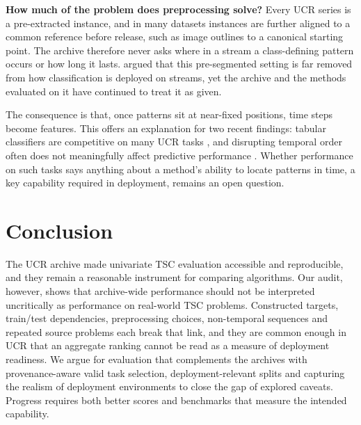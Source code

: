 \documentclass{article}
\begin{document}
\textbf{How much of the problem does preprocessing solve?}
Every UCR series is a pre-extracted instance, and in many datasets instances are further aligned to a common reference before release, such as image outlines to a canonical starting point. The archive therefore never asks where in a stream a class-defining pattern occurs or how long it lasts. \citet{hu2016streaming} argued that this pre-segmented setting is far removed from how classification is deployed on streams, yet the archive and the methods evaluated on it have continued to treat it as given.

The consequence is that, once patterns sit at near-fixed positions, time steps become features. This offers an explanation for two recent findings: tabular classifiers are competitive on many UCR tasks \citep{dhariyal2023backtobasics}, and disrupting temporal order often does not meaningfully affect predictive performance \citep{zhang2025revisit}. Whether performance on such tasks says anything about a method's ability to locate patterns in time, a key capability required in deployment, remains an open question.



\section{Conclusion}
The UCR archive made univariate TSC evaluation accessible and reproducible, and they remain a reasonable instrument for comparing algorithms. Our audit, however, shows that archive-wide performance should not be interpreted uncritically as performance on real-world TSC problems. Constructed targets, train/test dependencies, preprocessing choices, non-temporal sequences and repeated source problems each break that link, and they are common enough in UCR that an aggregate ranking cannot be read as a measure of deployment readiness. We argue for evaluation that complements the archives with provenance-aware valid task selection, deployment-relevant splits and capturing the realism of deployment environments to close the gap of explored caveats. Progress requires both better scores and benchmarks that measure the intended capability.
\end{document}
